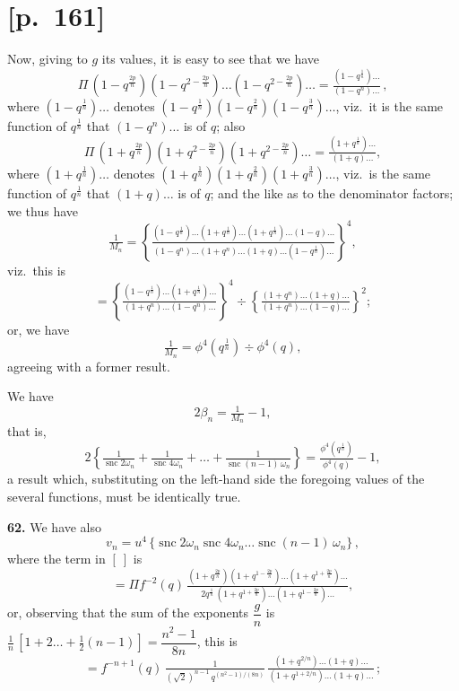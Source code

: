 \documentclass[11pt]{article}
\begin{document}
\section*{[p.~161]}
Now, giving to $g$ its values, it is easy to see that we have
\[
\Pi\,(1-q^{\frac{2p}{n}})(1-q^{2-\frac{2p}{n}})\ldots(1-q^{2-\frac{2p}{n}})\ldots=\tfrac{(1-q^{\frac{1}{n}})\ldots}{(1-q^n)\ldots}\,,
\]
where $(1-q^{\frac{1}{n}})\ldots$ denotes $(1-q^{\frac{1}{n}})(1-q^{\frac{2}{n}})(1-q^{\frac{3}{n}})\ldots$, viz.\ it is the same function of $q^{\frac{1}{n}}$ that
$(1-q^n)\ldots$ is of $q$; also
\[
\Pi\,(1+q^{\frac{2p}{n}})(1+q^{2-\frac{2p}{n}})(1+q^{2-\frac{2p}{n}})\ldots=\tfrac{(1+q^{\frac{1}{n}})\ldots}{(1+q)\ldots},
\]
where $(1+q^{\frac{1}{n}})\ldots$ denotes $(1+q^{\frac{1}{n}})(1+q^{\frac{2}{n}})(1+q^{\frac{3}{n}})\ldots$, viz.\ is the same function of $q^{\frac{1}{n}}$
that $(1+q)\ldots$ is of $q$; and the like as to the denominator factors; we thus have
\[
\tfrac{1}{M_n}=\!\left\{\tfrac{(1-q^{\frac{1}{n}})\ldots(1+q^{\frac{1}{n}})\ldots(1+q^{\frac{1}{n}})\ldots(1-q)\ldots}{(1-q^n)\ldots(1+q^n)\ldots(1+q)\ldots(1-q^{\frac{1}{n}})\ldots}\right\}^{\!4}\!,
\]
viz.\ this is
\[
=\!\left\{\tfrac{(1-q^{\frac{1}{n}})\ldots(1+q^{\frac{1}{n}})\ldots}{(1+q^n)\ldots(1-q^n)\ldots}\right\}^{\!4}\div\!\left\{\tfrac{(1+q^n)\ldots(1+q)\ldots}{(1+q^n)\ldots(1-q)\ldots}\right\}^{\!2}\!;
\]
or, we have
\[
\tfrac{1}{M_n}=\phi^4(q^{\frac{1}{n}})\div\phi^4(q),
\]
agreeing with a former result.

We have
\[
2\beta_n=\tfrac{1}{M_n}-1,
\]
that is,
\[
2\!\left\{\tfrac{1}{\operatorname{snc}2\omega_n}+\tfrac{1}{\operatorname{snc}4\omega_n}+\ldots+\tfrac{1}{\operatorname{snc}(n-1)\,\omega_n}\right\}\!=\tfrac{\phi^4(q^{\frac{1}{n}})}{\phi^4(q)}-1,
\]
a result which, substituting on the left-hand side the foregoing values of the several
functions, must be identically true.

\medskip
\noindent\textbf{62.} We have also
\[
v_n=u^4\,\{\operatorname{snc}2\omega_n\operatorname{snc}4\omega_n\ldots\operatorname{snc}(n-1)\,\omega_n\}\,,
\]
where the term in $[\ ]$ is
\[
=\Pi f^{-2}(q)\,\tfrac{(1+q^{\frac{2p}{n}})(1+q^{1-\frac{2p}{n}})\ldots(1+q^{1+\frac{2p}{n}})\ldots}{2q^{\frac{1}{n}}\,(1+q^{1+\frac{2p}{n}})\ldots(1+q^{1-\frac{2p}{n}})\ldots},
\]
or, observing that the sum of the exponents $\dfrac{g}{n}$ is $\tfrac{1}{n}\,[1+2\ldots+\tfrac{1}{2}(n-1)]=\dfrac{n^2-1}{8n}$, this is
\[
=f^{-n+1}(q)\,\tfrac{1}{(\sqrt{2})^{n-1}\,q^{(n^2-1)/(8n)}}\,\tfrac{(1+q^{2/n})\ldots(1+q)\ldots}{(1+q^{1+2/n})\ldots(1+q)\ldots}\,;
\]
\end{document}
